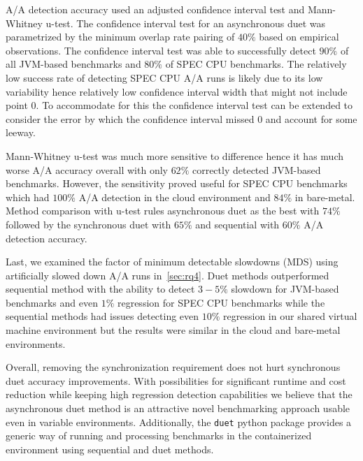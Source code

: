 A/A detection accuracy used an adjusted confidence interval test and \mbox{Mann-Whitney} \mbox{u-test}.
The confidence interval test for an asynchronous duet was parametrized by the minimum overlap rate pairing of $40\%$ based on empirical observations.
The confidence interval test was able to successfully detect $90\%$ of all \mbox{JVM-based} benchmarks and $80\%$ of SPEC CPU benchmarks.
The relatively low success rate of detecting SPEC CPU A/A runs is likely due to its low variability hence relatively low confidence interval width that might not include point $0$.
To accommodate for this the confidence interval test can be extended to consider the error by which the confidence interval missed $0$ and account for some leeway.

\mbox{Mann-Whitney} \mbox{u-test} was much more sensitive to difference hence it has much worse A/A accuracy overall with only $62\%$ correctly detected \mbox{JVM-based} benchmarks.
However, the sensitivity proved useful for SPEC CPU benchmarks which had $100\%$ A/A detection in the cloud environment and $84\%$ in \mbox{bare-metal}.
Method comparison with \mbox{u-test} rules asynchronous duet as the best with $74\%$ followed by the synchronous duet with $65\%$ and sequential with $60\%$ A/A detection accuracy.

Last, we examined the factor of minimum detectable slowdowns (MDS) using artificially slowed down A/A runs in~\cref{sec:rq4}.
Duet methods outperformed sequential method with the ability to detect $3-5\%$ slowdown for \mbox{JVM-based} benchmarks and even $1\%$ regression for SPEC CPU benchmarks while the sequential methods had issues detecting even $10\%$ regression in our shared virtual machine environment but the results were similar in the cloud and bare-metal environments.

Overall, removing the synchronization requirement does not hurt synchronous duet accuracy improvements.
With possibilities for significant runtime and cost reduction while keeping high regression detection capabilities we believe that the asynchronous duet method is an attractive novel benchmarking approach usable even in variable environments.
Additionally, the \lstinline{duet} python package provides a generic way of running and processing benchmarks in the containerized environment using sequential and duet methods.

